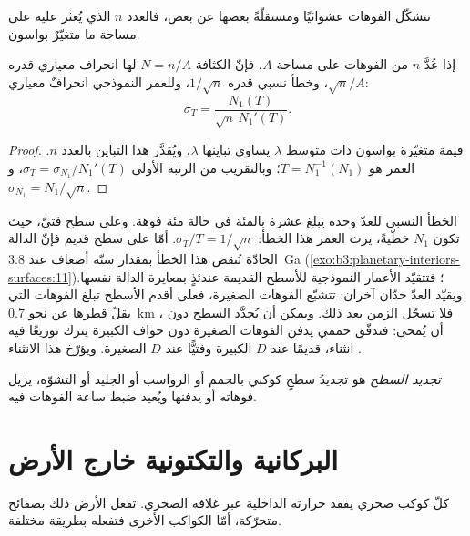 تتشكّل الفوهات عشوائيًا ومستقلّةً بعضها عن بعض، فالعدد
$n$ الذي يُعثر عليه على مساحة ما متغيّرٌ بواسون.

\begin{proposition}\label{prop:b3:planetary-interiors-surfaces:poisson}
إذا عُدَّ $n$ من الفوهات على مساحة $A$، فإنّ الكثافة $N = n/A$ لها انحراف معياري
قدره $\sqrt n/A$، وخطأ نسبي قدره $1/\sqrt n$، وللعمر النموذجي
انحرافٌ معياري:
\[
  \sigma_T = \frac{N_1(T)}{\sqrt n\,N_1'(T)} .
\]
\end{proposition}

\begin{proof}
قيمة متغيّرة بواسون ذات متوسط $\lambda$ يساوي تباينها $\lambda$، ويُقدَّر هذا التباين بالعدد $n$.
العمر هو $T = N_1^{-1}(N_1)$؛ وبالتقريب من الرتبة الأولى $\sigma_T =
\sigma_{N_1}/N_1'(T)$، و$\sigma_{N_1} = N_1/\sqrt n$.
\end{proof}

الخطأ النسبي للعدّ وحده يبلغ عشرة بالمئة في حالة مئة
فوهة. وعلى سطح فتيّ، حيث تكون $N_1$ خطّيةً، يرث العمر هذا الخطأ:
$\sigma_T/T = 1/\sqrt n$. أمّا على سطح قديم فإنّ الدالة الحادّة تُنقص هذا الخطأ بمقدار
ستّة أضعاف عند \qty{3.8}{Ga} (\cref{exo:b3:planetary-interiors-surfaces:11})؛
فتتقيّد الأعمار النموذجية للأسطح القديمة عندئذٍ
بمعايرة الدالة نفسها. ويقيّد العدّ حدّان آخران: تتشبّع الفوهات الصغيرة،
فعلى أقدم الأسطح تبلغ الفوهات التي يقلّ قطرها عن نحو \qty{0.7}{km}
، فلا تسجّل الزمن بعد ذلك. ويمكن أن يُجدَّد السطح دون أن يُمحى:
فتدفّق حممي يدفن الفوهات الصغيرة دون حواف الكبيرة يترك توزيعًا فيه انثناء،
قديمًا عند $D$ الكبيرة وفتيًّا عند $D$ الصغيرة.
ويؤرّخ هذا الانثناء .

\begin{definition}\label{def:b3:planetary-interiors-surfaces:resurfacing}
\emph{تجديد السطح} هو تجديدُ سطحٍ كوكبي
بالحمم أو الرواسب أو الجليد أو التشوّه، يزيل فوهاته أو يدفنها
ويُعيد ضبط ساعة الفوهات فيه.
\end{definition}

\section{البركانية والتكتونية خارج الأرض}\label{sec:b3:planetary-interiors-surfaces:volcanism}

كلّ كوكب صخري يفقد حرارته الداخلية عبر غلافه الصخري.
تفعل الأرض ذلك بصفائح متحرّكة، أمّا الكواكب الأخرى فتفعله بطريقة مختلفة.

